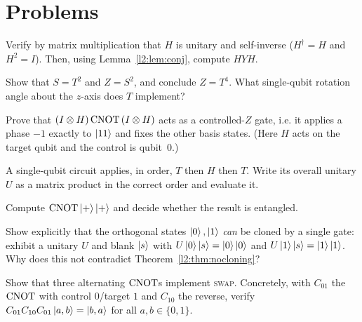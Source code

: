 \section{Problems}

\begin{exercise}\label{l2:ex:hth}
Verify by matrix multiplication that $H$ is unitary and self-inverse
($H^{\dagger}=H$ and $H^{2}=I$). Then, using Lemma~\ref{l2:lem:conj}, compute
$HYH$.
\end{exercise}

\begin{exercise}\label{l2:ex:st}
Show that $S=T^{2}$ and $Z=S^{2}$, and conclude $Z=T^{4}$. What single-qubit
rotation angle about the $z$-axis does $T$ implement?
\end{exercise}

\begin{exercise}\label{l2:ex:cnot-conj}
Prove that $(I\otimes H)\,\mathrm{CNOT}\,(I\otimes H)$ acts as a controlled-$Z$ gate,
i.e. it applies a phase $-1$ exactly to $\ket{11}$ and fixes the other basis
states. (Here $H$ acts on the target qubit and the control is qubit~$0$.)
\end{exercise}

\begin{exercise}\label{l2:ex:reverse}
A single-qubit circuit applies, in order, $T$ then $H$ then $T$. Write its
overall unitary $U$ as a matrix product in the correct order and evaluate it.
\end{exercise}

\begin{exercise}\label{l2:ex:cnot-plus}
Compute $\mathrm{CNOT}\ket{+}\ket{+}$ and decide whether the result is entangled.
\end{exercise}

\begin{exercise}\label{l2:ex:noclone-orth}
Show explicitly that the orthogonal states $\ket{0},\ket{1}$ \emph{can} be cloned
by a single gate: exhibit a unitary $U$ and blank $\ket{s}$ with
$U\ket{0}\ket{s}=\ket{0}\ket{0}$ and $U\ket{1}\ket{s}=\ket{1}\ket{1}$. Why does
this not contradict Theorem~\ref{l2:thm:nocloning}?
\end{exercise}

\begin{exercise}\label{l2:ex:swap}
Show that three alternating $\mathrm{CNOT}$s implement \textsc{swap}. Concretely, with
$C_{01}$ the $\mathrm{CNOT}$ with control $0$/target $1$ and $C_{10}$ the reverse, verify
$C_{01}C_{10}C_{01}\ket{a,b}=\ket{b,a}$ for all $a,b\in\{0,1\}$.
\end{exercise}

